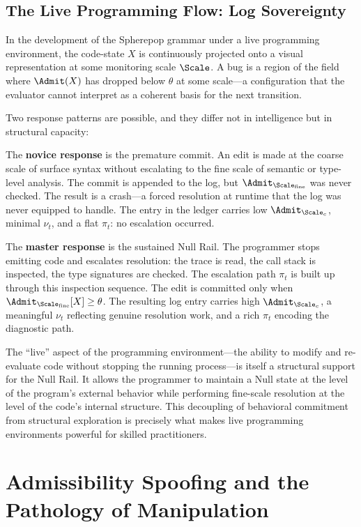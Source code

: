 \documentclass[11pt,oneside]{book}
\begin{document}
\section{The Live Programming Flow: Log Sovereignty}

In the development of the Spherepop grammar under a live programming environment, the code-state $X$ is continuously projected onto a visual representation at some monitoring scale $\Scale$. A bug is a region of the field where $\Admit(X)$ has dropped below $\theta$ at some scale---a configuration that the evaluator cannot interpret as a coherent basis for the next transition.

Two response patterns are possible, and they differ not in intelligence but in structural capacity:

The \textbf{novice response} is the premature commit. An edit is made at the coarse scale of surface syntax without escalating to the fine scale of semantic or type-level analysis. The commit is appended to the log, but $\Admit_{\Scale_{\mathrm{fine}}}$ was never checked. The result is a crash---a forced resolution at runtime that the log was never equipped to handle. The entry in the ledger carries low $\Admit_{\Scale_c}$, minimal $\nu_t$, and a flat $\pi_t$: no escalation occurred.

The \textbf{master response} is the sustained Null Rail. The programmer stops emitting code and escalates resolution: the trace is read, the call stack is inspected, the type signatures are checked. The escalation path $\pi_t$ is built up through this inspection sequence. The edit is committed only when $\Admit_{\Scale_{\mathrm{fine}}}[X] \ge \theta$. The resulting log entry carries high $\Admit_{\Scale_c}$, a meaningful $\nu_t$ reflecting genuine resolution work, and a rich $\pi_t$ encoding the diagnostic path.

The ``live'' aspect of the programming environment---the ability to modify and re-evaluate code without stopping the running process---is itself a structural support for the Null Rail. It allows the programmer to maintain a Null state at the level of the program's external behavior while performing fine-scale resolution at the level of the code's internal structure. This decoupling of behavioral commitment from structural exploration is precisely what makes live programming environments powerful for skilled practitioners.

\chapter{Admissibility Spoofing and the Pathology of Manipulation}
\end{document}

